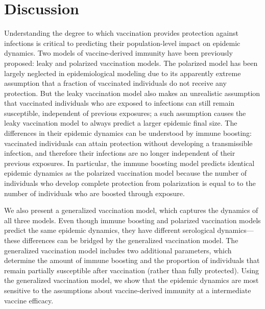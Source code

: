 \documentclass[12pt]{article}
\begin{document}
\section*{Discussion}

Understanding the degree to which vaccination provides protection against infections is critical to predicting their population-level impact on epidemic dynamics.
Two models of vaccine-derived immunity have been previously proposed: leaky and polarized vaccination models.
The polarized model has been largely neglected in epidemiological modeling due to its apparently extreme assumption that a fraction of vaccinated individuals do not receive any protection. 
But the leaky vaccination model also makes an unrealistic assumption that vaccinated individuals who are exposed to infections can still remain susceptible, independent of previous exposures; 
a such assumption causes the leaky vaccination model to always predict a larger epidemic final size.
The differences in their epidemic dynamics can be understood by immune boosting: vaccinated individuals can attain protection without developing a transmissible infection, and therefore their infections are no longer independent of their previous exposures.
In particular, the immune boosting model predicts identical epidemic dynamics as the polarized vaccination model because the number of individuals who develop complete protection from polarization is equal to to the number of individuals who are boosted through exposure.

We also present a generalized vaccination model, which captures the dynamics of all three models.
Even though immune boosting and polarized vaccination models predict the same epidemic dynamics, they have different serological dynamics---these differences can be bridged by the generalized vaccination model.
The generalized vaccination model includes two additional parameters, which determine the amount of immune boosting and the proportion of individuals that remain partially susceptible after vaccination (rather than fully protected).
Using the generalized vaccination model, we show that the epidemic dynamics are most sensitive to the assumptions about vaccine-derived immunity at a intermediate vaccine efficacy.
\end{document}

